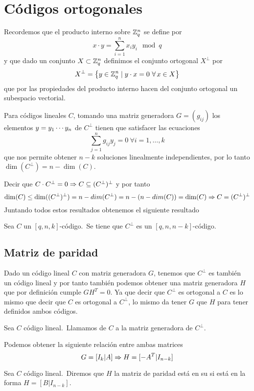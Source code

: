 \section{Códigos ortogonales}
Recordemos que el producto interno sobre $\mathbb{Z}_q^n$ se define por
\[
	x\cdot y=\sum_{i=1}^n x_i y_i\mod q
\]
y que dado un conjunto $X\subset \mathbb{Z}_q^n$ definimos el conjunto ortogonal $X^\perp$ por
\[
	X^{\perp}=\set{y\in\Z_q^n\tq y\cdot x = 0\ \forall x\in X}
\]
que por las propiedades del producto interno hacen del conjunto ortogonal un subespacio vectorial.

Para códigos lineales $C$, tomando una matriz generadora $G=(g_{ij})$ los elementos $y=y_1\cdots y_{n}$ de $C^\perp$ tienen que satisfacer las ecuaciones
\[
	\sum_{j=1}^n g_{ij}y_j=0\ \forall i=1,\dots, k
\]
que nos permite obtener $n-k$ soluciones linealmente independientes, por lo tanto $\dim(C^\perp)= n-\dim(C)$.

Decir que $C\cdot C^\perp=0\Rightarrow C\subseteq (C^\perp)^\perp$ y por tanto
\[
	\dim(C)\leq \dim((C^\perp)^\perp)= n-dim(C^\perp)= n-(n-dim(C))=\dim(C)\Rightarrow C=(C^\perp)^\perp
\]
Juntando todos estos resultados obtenemos el siguiente resultado
\begin{lemma}
	Sea $C$ un $[q, n, k]$-código.\ Se tiene que $C^\perp$ es un $[q, n, n-k]$-código.
\end{lemma}

\subsection{Matriz de paridad}
Dado un código lineal $C$ con matriz generadora $G$, tenemos que $C^\perp$ es también un código lineal y por tanto también podemos obtener una matriz generadora $H$ que por definición cumple $GH^T=0$.
Ya que decir que $C^\perp$ es ortogonal a $C$ es lo mismo que decir que $C$ es ortogonal a $C^\perp$, lo mismo da tener $G$ que $H$ para tener definidos ambos códigos.

\begin{definition}
	Sea $C$ código lineal.\ Llamamos  de $C$ a la matriz generadora de $C^\perp$.
\end{definition}

Podemos obtener la siguiente relación entre ambas matrices
\[
	G=[I_k|A]\Rightarrow H=[-A^T|I_{n-k}]
\]

\begin{definition}
	Sea $C$ código lineal.\ Diremos que $H$ la matriz de paridad está en su  si está en la forma $H=[B|I_{n-k}]$.
\end{definition}

